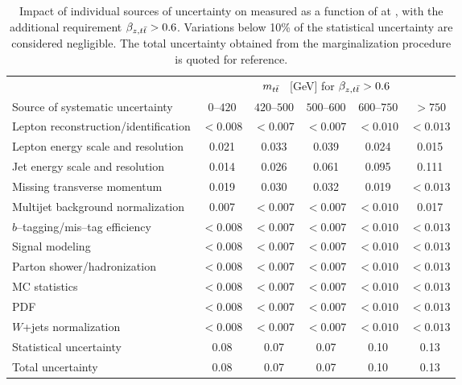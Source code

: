 \begin{table}[!htbp]\centering
\begin{tabular}{l c c c c c}
\toprule
 &\multicolumn{5}{c}{$m_{t\bar{t}}{}$ ~[GeV] for $\beta_{z,t\bar{t}} > 0.6$}    \\
Source of systematic uncertainty           &         $0$--$420$ & $420$--$500$      & $500$--$600$         & $600$--$750$      &   $>750$ \\
\midrule
Lepton reconstruction/identification              & $<0.008$ & $<0.007$ & $<0.007$ & $<0.010$ & $<0.013$  \\
Lepton energy scale and resolution                & 0.021 & 0.033 & 0.039 & 0.024 & 0.015 \\
Jet energy scale and resolution                   & 0.014 & 0.026 & 0.061 & 0.095 & 0.111 \\
Missing transverse momentum & 0.019 & 0.030 & 0.032 & 0.019 & $<0.013$ \\
Multijet background normalization    & 0.007 & $<0.007$ & $<0.007$ & $<0.010$ & 0.017 \\
$b$--tagging/mis--tag efficiency                & $<0.008$ & $<0.007$ & $<0.007$ & $<0.010$ & $<0.013$ \\
Signal modeling                        & $<0.008$ & $<0.007$ & $<0.007$ & $<0.010$ & $<0.013$ \\
Parton shower/hadronization             & $<0.008$ & $<0.007$ & $<0.007$ & $<0.010$ & $<0.013$ \\
MC statistics                 & $<0.008$ & $<0.007$ & $<0.007$ & $<0.010$ & $<0.013$ \\
PDF                                     & $<0.008$ & $<0.007$ & $<0.007$ & $<0.010$ & $<0.013$ \\
$W$+jets normalization        & $<0.008$ & $<0.007$ & $<0.007$ & $<0.010$ & $<0.013$ \\
\midrule
Statistical uncertainty       & 0.08             &        0.07      &        0.07      &       0.10       &         0.13     \\
\midrule
Total uncertainty       & 0.08             &        0.07      &        0.07      &       0.10       &         0.13     \\
\bottomrule
\end{tabular}
\caption{Impact of individual sources of uncertainty on
  \ac{} measured as a function of \mtt{} at \seventev{}, with the additional
  requirement $\beta_{z,t\bar{t}}{}>0.6$. Variations below 10\%
  of the statistical uncertainty are considered negligible. The total uncertainty obtained from the
  marginalization procedure is quoted for reference.}
\label{table:Systematics_mtt_beta}
\end{table}

